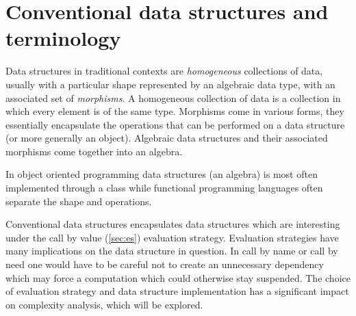\chapter{Conventional data structures and terminology}
Data structures in traditional contexts are \textit{homogeneous} collections of data, usually with a particular shape represented by an algebraic data type, with an associated set of \textit{morphisms}.
A homogeneous collection of data is a collection in which every element is of the same type.
Morphisms come in various forms, they essentially encapsulate the operations that can be performed on a data structure (or more generally an object).
Algebraic data structures and their associated morphisms come together into an algebra.
\begin{remark}
    In object oriented programming data structures (an algebra) is most often implemented through a class while functional programming languages often separate the shape and operations.
\end{remark}

Conventional data structures encapsulates data structures which are interesting under the call by value (\autoref{sec:es}) evaluation strategy.
Evaluation strategies have many implications on the data structure in question.
In call by name or call by need one would have to be careful not to create an unnecessary dependency which may force a computation which could otherwise stay suspended.
The choice of evaluation strategy and data structure implementation has a significant impact on complexity analysis, which will be explored.

